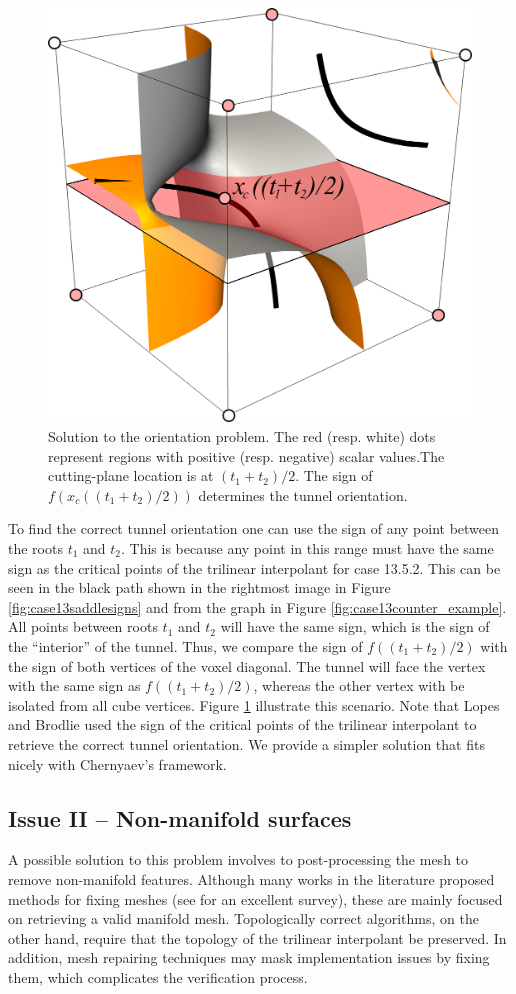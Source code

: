 \begin{figure}
     \centering
     \includegraphics[width=0.45\linewidth]{chapter4/figures/case13/solution.png}
     \caption{Solution to the orientation problem. The red (resp. white) dots represent regions with positive (resp. negative) scalar values.The cutting-plane location is at $(t_1 + t_2) / 2$. The sign of $f(x_c((t_1+t_2)/2))$ determines the tunnel orientation. }
     \label{fig:solution-case13}
\end{figure}

To find the correct tunnel orientation one can use the sign of any point between the roots $t_1$ and $t_2$. This is because any point in this range must have the same sign as the critical points of the trilinear interpolant for case 13.5.2. This can be seen in the black path shown in the rightmost image in Figure \ref{fig:case13saddlesigns} and from the graph in Figure \ref{fig:case13counter_example}. All points between roots $t_1$ and $t_2$ will have the same sign, which is the sign of the ``interior'' of the tunnel. Thus, we compare the sign of $f((t_1+t_2)/2)$ with the sign of both vertices of the voxel diagonal. The tunnel will face the vertex with the same sign as $f((t_1+t_2)/2)$, whereas the other vertex with be isolated from all cube vertices. Figure \ref{fig:solution-case13} illustrate this scenario. Note that Lopes and Brodlie  \cite{lopes:tvcg:2003} used the sign of the critical points of the trilinear interpolant to retrieve the correct tunnel orientation. We provide a simpler solution that fits nicely with Chernyaev's framework.


\subsection{Issue II -- Non-manifold surfaces}

A possible solution to this problem involves to post-processing the mesh to remove non-manifold features. Although  many works in the literature proposed methods for fixing meshes (see \cite{springerlink:10.1007/s11390-009-9206-7} for an excellent survey), these are mainly focused on retrieving a valid manifold mesh. Topologically correct algorithms, on the other hand, require that the topology of the trilinear interpolant  be preserved. In addition, mesh repairing techniques may mask implementation issues by fixing them, which complicates the verification process. 

